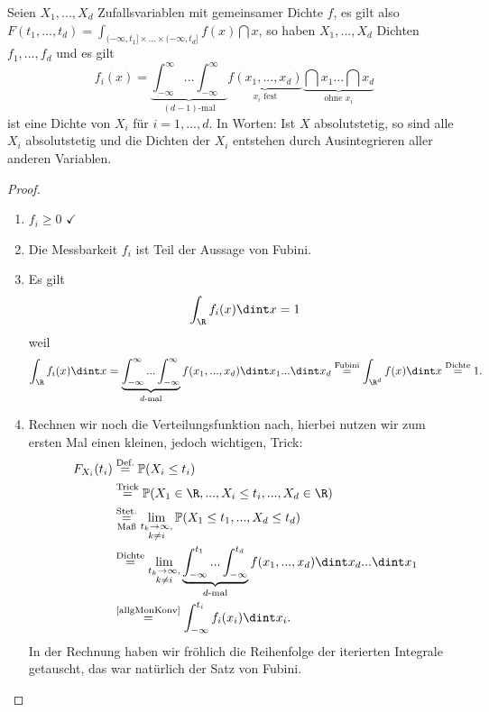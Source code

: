 \begin{prop}\label{p4}
	Seien $X_1,...,X_d$ Zufallsvariablen mit gemeinsamer Dichte $f$, es gilt also $ F(t_1,...,t_d) = \int_{(-\infty,t_1]\times ... \times (-\infty, t_d]} f(x)\dint x$, so haben $X_1,...,X_d$ Dichten $f_1,...,f_d$ und es gilt \[ f_i(x) = \underbrace{\int_{-\infty}^{\infty} ... \int_{-\infty}^{\infty}}_{(d-1)\text{-mal}} \underbrace{f(x_1,...,x_d)}_{x_i \text{ fest}} \underbrace{\dint x_1 ... \dint x_d}_{\text{ohne } x_i} \] ist eine Dichte von $X_i$ für $i=1,...,d$. In Worten: Ist $X$ absolutstetig, so sind alle $X_i$ absolutstetig und die Dichten der $X_i$ entstehen durch Ausintegrieren aller anderen Variablen.
\end{prop}

\begin{proof}\abs
	\begin{enumerate}[label=(\roman*)]
		\item $f_i \geq 0$ $\checkmark$ 
		\item Die Messbarkeit $f_i$ ist Teil der Aussage von Fubini.
		\item Es gilt  \[ \int_{\R} f_i(x) \dint x = 1 \] weil
		\[\int_{\R} f_i(x) \dint x = \underbrace{\int_{-\infty}^{\infty} ... \int_{-\infty}^{\infty}}_{d\text{-mal}} f(x_1,...,x_d) \dint x_1 ... \dint x_d \overset{\text{Fubini}}{=} \int_{\R^d} f(x) \dint x \overset{\text{Dichte}}{=} 1.  \]
		\item Rechnen wir noch die Verteilungsfunktion nach, hierbei nutzen wir zum ersten Mal einen kleinen, jedoch wichtigen, Trick:		
		\begin{align*}
			F_{X_i}(t_i) &\overset{\text{Def.}}{=} \mathbb{P}(X_i \leq t_i)\\
			& \overset{\text{Trick}}{=} \mathbb{P}(X_1 \in \R, ... , X_i \leq t_i, ..., X_d \in \R) \\
			&\overset{\text{Stet.}}{\underset{\text{Maß}}{=}} \lim\limits_{\substack{t_k \to \infty, \\ k \neq i}} \mathbb{P}(X_1 \leq t_1,...,X_d \leq t_d)\\
			& \overset{\text{Dichte}}{=} \lim\limits_{\substack{t_k \to \infty, \\ k \neq i}} \underbrace{\int_{-\infty}^{t_1} ... \int_{-\infty}^{t_d}}_{d\text{-mal}} f(x_1,...,x_d) \dint x_d ... \dint x_1 \\
			&\overset{\text{\ref{allgMonKonv}}}{=} \int_{-\infty}^{t_i} f_i(x_i) \dint x_i.
		\end{align*}
		In der Rechnung haben wir fr\"ohlich die Reihenfolge der iterierten Integrale getauscht, das war nat\"urlich der Satz von Fubini.
	\end{enumerate}
\end{proof}
